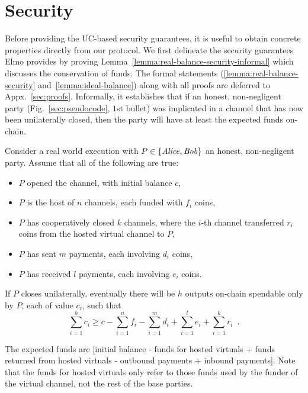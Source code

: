 \section{Security}
  \label{section:security}
    Before providing the UC-based security guarantees, it is useful to obtain
  concrete properties directly from our protocol. We first delineate the
  security guarantees Elmo provides by proving
  Lemma~\ref{lemma:real-balance-security-informal} which discusses the
  conservation of funds. The formal statements
  (\ref{lemma:real-balance-security} and~\ref{lemma:ideal-balance}) along with
  all proofs are deferred
  to Appx.~\ref{sec:proofs}. Informally, it
  establishes that if an honest, non-negligent party (Fig.~\ref{sec:pseudocode},
  $1$st bullet) was implicated in a channel
  that has now been unilaterally closed,
  then the party will have at least the expected funds on-chain.

\begin{lemma}
\label{lemma:real-balance-security-informal}
  Consider a real world execution with $P \in \{\mathit{Alice}, \mathit{Bob}\}$ an honest,
  non-negligent party. Assume that all of the following are true:
  \begin{itemize}
    \item $P$ opened the channel, with initial balance $c$,
    \item $P$ is the host of $n$ channels, each funded with $f_i$ coins,
    \item $P$ has cooperatively closed $k$ channels, where the $i$-th channel
    transferred $r_i$ coins from the hosted virtual channel to $P$,
    \item $P$ has sent $m$ payments, each involving $d_i$ coins,
    \item $P$ has received $l$ payments, each involving $e_i$ coins.
  \end{itemize}
  If $P$ closes unilaterally, eventually there will be $h$ outputs on-chain
  spendable only by $P$, each of value $c_i$, such that
  \begin{equation}
    \sum\limits_{i=1}^h c_i \geq c - \sum\limits_{i=1}^n f_i -
    \sum\limits_{i=1}^m d_i + \sum\limits_{i=1}^l e_i + \sum\limits_{i=1}^k r_i
    \enspace.
  \end{equation}
\end{lemma}

  The expected funds are [initial balance - funds for hosted
  virtuals + funds returned from hosted virtuals - outbound payments + inbound
  payments]. Note that the funds for hosted virtuals only refer to those funds
  used by the funder of the virtual channel, not the rest of the base parties.

